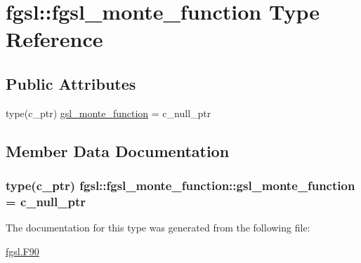 \hypertarget{structfgsl_1_1fgsl__monte__function}{\section{fgsl\-:\-:fgsl\-\_\-monte\-\_\-function Type Reference}
\label{structfgsl_1_1fgsl__monte__function}
}
\subsection*{Public Attributes}
\begin{DoxyCompactItemize}
\item 
type(c\-\_\-ptr) \hyperlink{structfgsl_1_1fgsl__monte__function_afb36c81cc5811938e740ccb264c7af51}{gsl\-\_\-monte\-\_\-function} = c\-\_\-null\-\_\-ptr
\end{DoxyCompactItemize}


\subsection{Member Data Documentation}
\hypertarget{structfgsl_1_1fgsl__monte__function_afb36c81cc5811938e740ccb264c7af51}{
\subsubsection[{gsl\-\_\-monte\-\_\-function}]{\setlength{\rightskip}{0pt plus 5cm}type(c\-\_\-ptr) fgsl\-::fgsl\-\_\-monte\-\_\-function\-::gsl\-\_\-monte\-\_\-function = c\-\_\-null\-\_\-ptr}}\label{structfgsl_1_1fgsl__monte__function_afb36c81cc5811938e740ccb264c7af51}


The documentation for this type was generated from the following file\-:\begin{DoxyCompactItemize}
\item 
\hyperlink{fgsl_8F90}{fgsl.\-F90}\end{DoxyCompactItemize}
